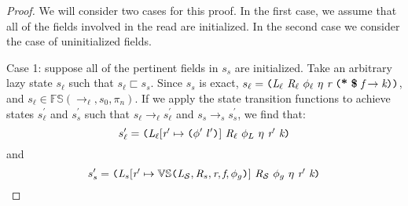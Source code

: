 \begin{proof}
We will consider two cases for this proof. In the first case, we assume that all of the fields involved in the read are initialized. In the second case we consider the case of uninitialized fields. 

Case 1: suppose all of the pertinent fields in $s_s$ are initialized. Take an arbitrary lazy state $s_\ell$ such that $s_\ell \sqsubset s_s$. Since $s_s$ is exact,  $s_\ell = \lp \cfgnt{L}_{\ell}\ \cfgnt{R}_{\ell}\ \phi_\ell\ \eta\ \cfgnt{r}\ \lp \cfgt{*}\ \cfgt{\$}\ \cfgnt{f} \rightarrow \cfgnt{k} \rp \rp$, and $s_\ell \in \mathbb{FS}(\rightarrow_{\ell},s_0,\pi_n)$. If we apply the state transition functions to achieve states $s_\ell^\prime$ and $s_s^\prime$ such that $s_\ell \rightarrow_\ell s_\ell^\prime$ and  $s_s \rightarrow_s s_s^\prime$, we find that:
$$s_\ell^\prime = \lp \cfgnt{L}_{\ell} [\cfgnt{r}^\prime \mapsto \lp\phi^\prime\ l^\prime\rp]\ \cfgnt{R}_{\ell}\ \phi_L\ \eta\ \cfgnt{r}^\prime\ \cfgnt{k}\rp $$
 and 
 $$ s_s^\prime = \lp \cfgnt{L}_{s}[\cfgnt{r}^\prime \mapsto \mathbb{VS}\lp \cfgnt{L}_{\mathcal{S}},\cfgnt{R}_{s},\cfgnt{r},\cfgnt{f},\phi_g\rp ]\ \cfgnt{R}_{\mathcal{S}}\ \phi_g\ \eta\ \cfgnt{r}^\prime\ \cfgnt{k}\rp $$


\end{proof}
